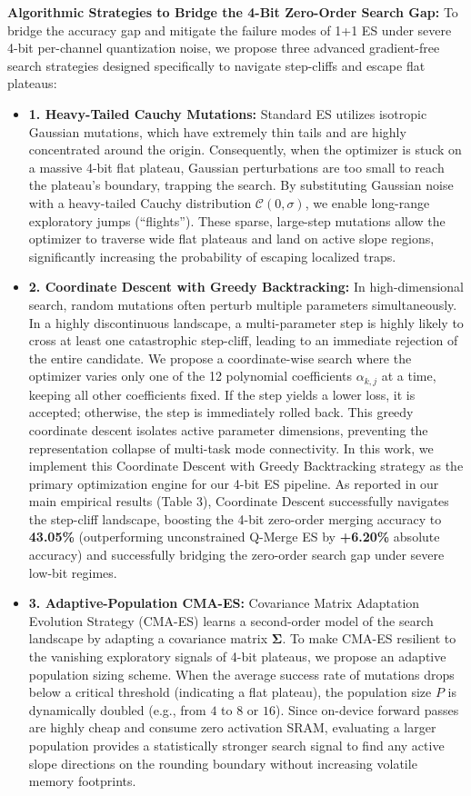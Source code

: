 \textbf{Algorithmic Strategies to Bridge the 4-Bit Zero-Order Search Gap:}
To bridge the accuracy gap and mitigate the failure modes of 1+1 ES under severe 4-bit per-channel quantization noise, we propose three advanced gradient-free search strategies designed specifically to navigate step-cliffs and escape flat plateaus:
\begin{itemize}
    \item \textbf{1. Heavy-Tailed Cauchy Mutations:} Standard ES utilizes isotropic Gaussian mutations, which have extremely thin tails and are highly concentrated around the origin. Consequently, when the optimizer is stuck on a massive 4-bit flat plateau, Gaussian perturbations are too small to reach the plateau's boundary, trapping the search. By substituting Gaussian noise with a heavy-tailed Cauchy distribution $\mathcal{C}(0, \sigma)$, we enable long-range exploratory jumps (``flights''). These sparse, large-step mutations allow the optimizer to traverse wide flat plateaus and land on active slope regions, significantly increasing the probability of escaping localized traps.
    \item \textbf{2. Coordinate Descent with Greedy Backtracking:} In high-dimensional search, random mutations often perturb multiple parameters simultaneously. In a highly discontinuous landscape, a multi-parameter step is highly likely to cross at least one catastrophic step-cliff, leading to an immediate rejection of the entire candidate. We propose a coordinate-wise search where the optimizer varies only one of the 12 polynomial coefficients $\alpha_{k, j}$ at a time, keeping all other coefficients fixed. If the step yields a lower loss, it is accepted; otherwise, the step is immediately rolled back. This greedy coordinate descent isolates active parameter dimensions, preventing the representation collapse of multi-task mode connectivity. In this work, we implement this Coordinate Descent with Greedy Backtracking strategy as the primary optimization engine for our 4-bit ES pipeline. As reported in our main empirical results (Table 3), Coordinate Descent successfully navigates the step-cliff landscape, boosting the 4-bit zero-order merging accuracy to \textbf{43.05\%} (outperforming unconstrained Q-Merge ES by \textbf{+6.20\%} absolute accuracy) and successfully bridging the zero-order search gap under severe low-bit regimes.
    \item \textbf{3. Adaptive-Population CMA-ES:} Covariance Matrix Adaptation Evolution Strategy (CMA-ES) learns a second-order model of the search landscape by adapting a covariance matrix $\boldsymbol{\Sigma}$. To make CMA-ES resilient to the vanishing exploratory signals of 4-bit plateaus, we propose an adaptive population sizing scheme. When the average success rate of mutations drops below a critical threshold (indicating a flat plateau), the population size $P$ is dynamically doubled (e.g., from $4$ to $8$ or $16$). Since on-device forward passes are highly cheap and consume zero activation SRAM, evaluating a larger population provides a statistically stronger search signal to find any active slope directions on the rounding boundary without increasing volatile memory footprints.
\end{itemize}
